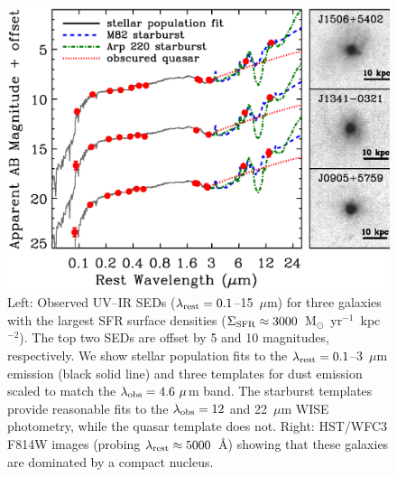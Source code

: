 \documentclass[12pt,preprint]{aastex}
\newcommand{\units}{M$_{\odot}$~yr$^{-1}$~kpc$^{-2}$}
\newcommand{\lrest}{\lambda_{\textnormal{\scriptsize{rest}}}}
\newcommand{\lobs}{\lambda_{\textnormal{\scriptsize{obs}}}}
\newcommand{\sigmasfr}{\Sigma_{\textnormal{\scriptsize{SFR}}}}
\begin{document}
\clearpage

\begin{figure}[!t]
\begin{center}
\includegraphics[angle=0,scale=0.7]{f1.ps}
\caption{Left: Observed UV--IR SEDs ($\lrest=0.1$--15~$\mu$m) for
  three galaxies with the largest SFR surface densities
  ($\sigmasfr\approx3000$~\units).  The top two SEDs are offset by 5
  and 10 magnitudes, respectively.  We show stellar population fits to
  the $\lrest=0.1$--3~$\mu$m emission (black solid line) and three
  templates for dust emission \citep[M82 starburst, blue dashed line;
    Arp 220 starburst, green dot-dashed line; obscured quasar, red
    dotted line;][]{pol07} scaled to match the $\lobs=4.6~\mu$m band.
  The starburst templates provide reasonable fits to the $\lobs=12$
  and 22~$\mu$m WISE photometry, while the quasar template does not.
  Right: HST/WFC3 F814W images (probing $\lrest\approx5000$~\AA)
  showing that these galaxies are dominated by a compact nucleus.}
\label{fig:seds}
\end{center}
\end{figure}

\clearpage
\end{document}
